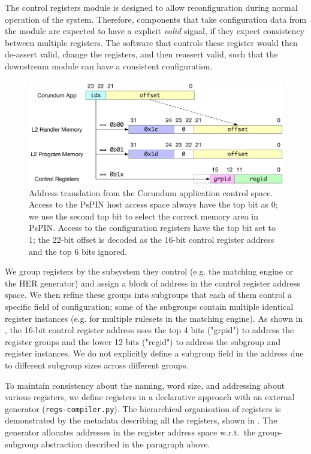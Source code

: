 The control registers module is designed to allow reconfiguration during normal operation of the system.  Therefore, components that take configuration data from the module are expected to have a explicit \emph{valid} signal, if they expect consistency between multiple registers.  The software that controls these register would then de-assert valid, change the registers, and then reassert valid, such that the downstream module can have a consistent configuration.

\begin{figure}
    \centering
    \includegraphics[width=.8\textwidth]{thesis/figures/corundum-pspin-addr.pdf}
    \caption{Address translation from the Corundum application control space.  Access to the PsPIN host access space always have the top bit as 0; we use the second top bit to select the correct memory area in PsPIN.  Access to the configuration registers have the top bit set to 1; the 22-bit offset is decoded as the 16-bit control register address and the top 6 bits ignored.} \label{fig:hw-addr-map}
\end{figure}

We group registers by the subsystem they control (e.g. the matching engine or the HER generator) and assign a block of address in the control register address space.  We then refine these groups into subgroups that each of them control a specific field of configuration; some of the subgroups contain multiple identical register instances (e.g. for multiple rulesets in the matching engine).  As shown in , the 16-bit control register address uses the top 4 bits ("grpid") to address the register groups and the lower 12 bits ("regid") to address the subgroup and register instances.  We do not explicitly define a subgroup field in the address due to different subgroup sizes across different groups.

To maintain consistency about the naming, word size, and addressing about various registers, we define registers in a declarative approach with an external generator (\texttt{regs-compiler.py}).  The hierarchical organisation of registers is demonstrated by the metadata describing all the registers, shown in .  The generator allocates addresses in the register address space w.r.t.\ the group-subgroup abstraction described in the paragraph above.

